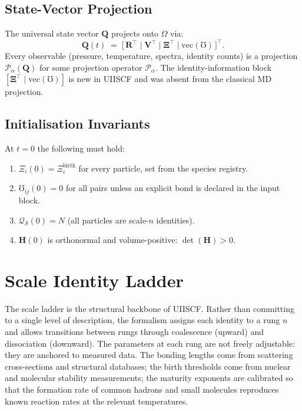 \documentclass[11pt,a4paper]{article}
\newcommand{\Rec}{\Xi}
\newcommand{\Cond}{\mho}
\newcommand{\Quota}{\mathcal{Q}}
\newcommand{\Qvec}{\mathbf{Q}}
\begin{document}
\subsection{State-Vector Projection}

The universal state vector $\Qvec$ projects onto $\Omega$ via:
\[
  \Qvec(t) \;=\;
  \bigl[\,\mathbf{R}^\top \;\big|\; \mathbf{V}^\top \;\big|\;
         \boldsymbol{\Rec}^\top \;\big|\; \mathrm{vec}(\boldsymbol{\Cond}) \,\bigr]^\top .
\]
Every observable (pressure, temperature, spectra, identity counts) is a
projection $\mathcal{P}_\alpha(\Qvec)$ for some projection operator
$\mathcal{P}_\alpha$.  The identity-information block
$[\boldsymbol{\Rec}^\top \mid \mathrm{vec}(\boldsymbol{\Cond})]$ is new in
UIISCF and was absent from the classical MD projection.

\subsection{Initialisation Invariants}

At $t=0$ the following must hold:
\begin{enumerate}[leftmargin=1.5em]
  \item $\Rec_i(0) = \Rec_i^{\mathrm{birth}}$ for every particle, set from
    the species registry.
  \item $\Cond_{ij}(0) = 0$ for all pairs unless an explicit bond is declared
    in the input block.
  \item $\Quota_S(0) = N$ (all particles are scale-$n$ identities).
  \item $\mathbf{H}(0)$ is orthonormal and volume-positive:
    $\det(\mathbf{H}) > 0$.
\end{enumerate}


\section{Scale Identity Ladder}\label{sec:ladder}

The scale ladder is the structural backbone of UIISCF.  Rather than
committing to a single level of description, the formalism assigns each
identity to a rung $n$ and allows transitions between rungs through
coalescence (upward) and dissociation (downward).  The parameters at each
rung are not freely adjustable: they are anchored to measured data.  The
bonding lengths come from scattering cross-sections and structural databases;
the birth thresholds come from nuclear and molecular stability measurements;
the maturity exponents are calibrated so that the formation rate of common
hadrons and small molecules reproduces known reaction rates at the relevant
temperatures.
\end{document}
